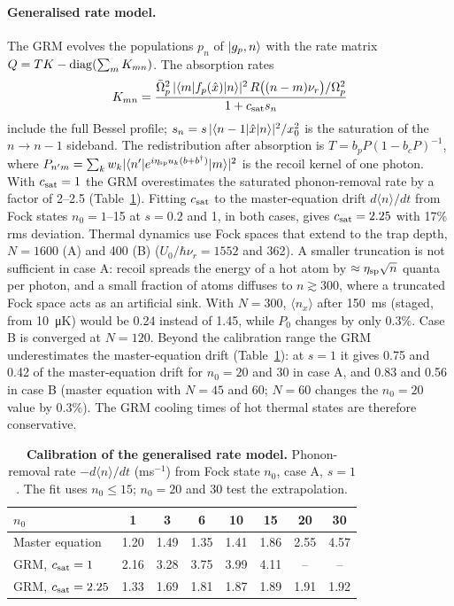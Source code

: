\documentclass[10pt,twocolumn,a4paper]{article}
\begin{document}
\paragraph{Generalised rate model.}
The GRM evolves the populations $p_n$ of $|g_p,n\rangle$ with the rate matrix $Q=TK-{\rm diag}(\sum_mK_{mn})$. The absorption rates
\begin{equation}
  K_{mn}=\frac{\bar{\Omega}_p^2\,|\langle m| f_p(\hat x)|n\rangle|^2\,R\big((n-m)\nu_r\big)/\Omega_p^2}{1+c_{\rm sat}s_n}
\end{equation}
include the full Bessel profile; $s_n=s\,|\langle n-1|\hat x|n\rangle|^2/x_0^2$ is the saturation of the $n\to n-1$ sideband. The redistribution after absorption is $T=b_pP(1-b_cP)^{-1}$, where $P_{n'm}=\sum_kw_k|\langle n'|e^{i\eta_{\rm sp}u_k(b+b^\dagger)}|m\rangle|^2$ is the recoil kernel of one photon. With $c_{\rm sat}=1$ the GRM overestimates the saturated phonon-removal rate by a factor of 2--2.5 (Table~\ref{tab:calib}). Fitting $c_{\rm sat}$ to the master-equation drift $d\langle n\rangle/dt$ from Fock states $n_0=1$--15 at $s=0.2$ and 1, in both cases, gives $c_{\rm sat}=2.25$ with 17\% rms deviation. Thermal dynamics use Fock spaces that extend to the trap depth, $N=1600$ (A) and 400 (B) ($U_0/\hbar\nu_r=1552$ and 362). A smaller truncation is not sufficient in case A: recoil spreads the energy of a hot atom by $\approx\eta_{\rm sp}\sqrt n$ quanta per photon, and a small fraction of atoms diffuses to $n\gtrsim300$, where a truncated Fock space acts as an artificial sink. With $N=300$, $\langle n_x\rangle$ after \SI{150}{ms} (staged, from \SI{10}{\micro K}) would be 0.24 instead of 1.45, while $P_0$ changes by only 0.3\%. Case B is converged at $N=120$. Beyond the calibration range the GRM underestimates the master-equation drift (Table~\ref{tab:calib}): at $s=1$ it gives 0.75 and 0.42 of the master-equation drift for $n_0=20$ and 30 in case A, and 0.83 and 0.56 in case B (master equation with $N=45$ and 60; $N=60$ changes the $n_0=20$ value by 0.3\%). The GRM cooling times of hot thermal states are therefore conservative.

\begin{table}[t]
\caption{\textbf{Calibration of the generalised rate model.} Phonon-removal rate $-d\langle n\rangle/dt$ (ms$^{-1}$) from Fock state $n_0$, case A, $s=1$. The fit uses $n_0\leq15$; $n_0=20$ and 30 test the extrapolation.}
\label{tab:calib}
\centering\footnotesize\sffamily
\begin{tabular}{@{}lccccccc@{}}
\toprule
$n_0$ & 1 & 3 & 6 & 10 & 15 & 20 & 30\\
\midrule
Master equation & 1.20 & 1.49 & 1.35 & 1.41 & 1.86 & 2.55 & 4.57\\
GRM, $c_{\rm sat}=1$ & 2.16 & 3.28 & 3.75 & 3.99 & 4.11 & -- & --\\
GRM, $c_{\rm sat}=2.25$ & 1.33 & 1.69 & 1.81 & 1.87 & 1.89 & 1.91 & 1.92\\
\bottomrule
\end{tabular}
\end{table}
\end{document}
